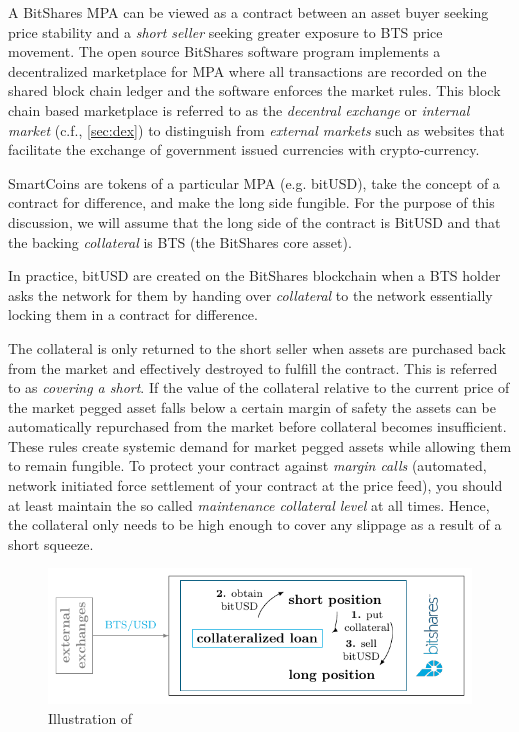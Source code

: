\label{sec:mpa}

A BitShares MPA can be viewed as a contract between an asset buyer seeking
price stability and a \emph{short seller} seeking greater exposure to BTS price
movement. The open source BitShares software program implements a decentralized
marketplace for MPA where all transactions are recorded on the shared block
chain ledger and the software enforces the market rules. This block chain based
marketplace is referred to as the \emph{decentral exchange} or \emph{internal
market} (c.f., \cref{sec:dex}) to distinguish from \emph{external markets} such
as websites that facilitate the exchange of government issued currencies with
crypto-currency. 

SmartCoins are tokens of a particular MPA (e.g. bitUSD), take the concept of a
contract for difference, and make the long side fungible. For the purpose of
this discussion, we will assume that the long side of the contract is BitUSD
and that the backing \emph{collateral} is BTS (the BitShares core asset).

In practice, bitUSD are created on the BitShares blockchain when a BTS holder
asks the network for them by handing over \emph{collateral} to the network
essentially locking them in a contract for difference.

The collateral is only returned to the short seller when assets are purchased
back from the market and effectively destroyed to fulfill the contract. This is
referred to as \emph{covering a short}. If the value of the collateral relative
to the current price of the market pegged asset falls below a certain margin of
safety the assets can be automatically repurchased from the market before
collateral becomes insufficient. These rules create systemic demand for market
pegged assets while allowing them to remain fungible. To protect your contract
against \emph{margin calls} (automated, network initiated force settlement of
your contract at the price feed), you should at least maintain the so called
\emph{maintenance collateral level} at all times. Hence, the collateral only
needs to be high enough to cover any slippage as a result of a short squeeze.

\begin{figure}[!htp]
 \begin{center}
  \includegraphics[width=.8\linewidth]{figures/external-pricefeed}
 \end{center}
 \caption{Illustration of }
 \label{fig:btsdex}
\end{figure}

